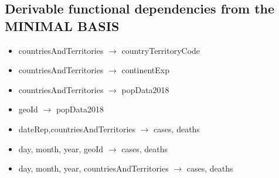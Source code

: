 \documentclass{article}
\begin{document}
\newpage
\subsection{Derivable functional dependencies from the MINIMAL BASIS} \label{FS}
\begin{multicols}{2}
\begin{itemize}
    \item countriesAndTerritories $\rightarrow$ countryTerritoryCode
    \item countriesAndTerritories $\rightarrow$ continentExp
    \item countriesAndTerritories $\rightarrow$ popData2018
    \item geoId $\rightarrow$ popData2018
    \item dateRep,countriesAndTerritories $\rightarrow$ cases, deaths
    \item day, month, year, geoId $\rightarrow$ cases, deaths
    \item day, month, year, countriesAndTerritories $\rightarrow$ cases, deaths
\end{itemize}
\end{multicols}
\end{document}
